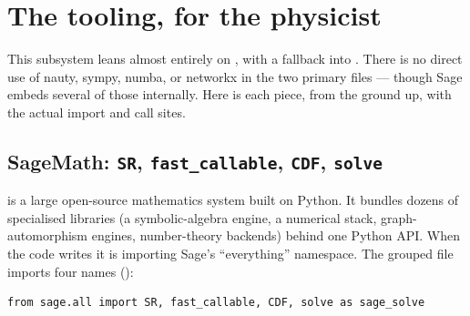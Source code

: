 \section{The tooling, for the physicist}

This subsystem leans almost entirely on , with a fallback into
. There is no direct use of nauty, sympy, numba, or networkx in the
two primary files --- though Sage embeds several of those internally. Here is each
piece, from the ground up, with the actual import and call sites.

\subsection{SageMath: \texttt{SR}, \texttt{fast\_callable}, \texttt{CDF}, \texttt{solve}}

 is a large open-source mathematics system built on Python. It
bundles dozens of specialised libraries (a symbolic-algebra engine, a numerical
stack, graph-automorphism engines, number-theory backends) behind one Python API.
When the code writes  it is importing Sage's
``everything'' namespace. The grouped file imports four names
():
\begin{lstlisting}
from sage.all import SR, fast_callable, CDF, solve as sage_solve
\end{lstlisting}


